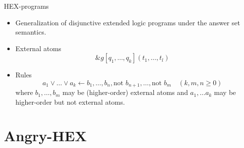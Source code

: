 \documentclass[smaller,dvipsnames]{beamer}
\newcommand{\ah}{Angry-HEX\xspace}
\begin{document}
\begin{frame}{HEX-programs}
    \begin{itemize}[<+->]
    	\item Generalization of disjunctive extended logic programs under the answer set semantics.
    	\item External atoms \[ \&g[q_1,\dots,q_k](t_1,\dots,t_l) \]
    	\item Rules \[ a_1 \lor \dots \lor a_k \leftarrow b_1, \dots , b_n, \text{not } b_{n+1}, \dots, \text{not } b_m \quad (k,m,n \geq 0)\] where \(b_1, \dots, b_m\) may be (higher-order) external atoms and \(a_1, \ldots a_k\) may be higher-order but not external atoms. 
    \end{itemize}
\end{frame}

\section{\ah}
\end{document}
